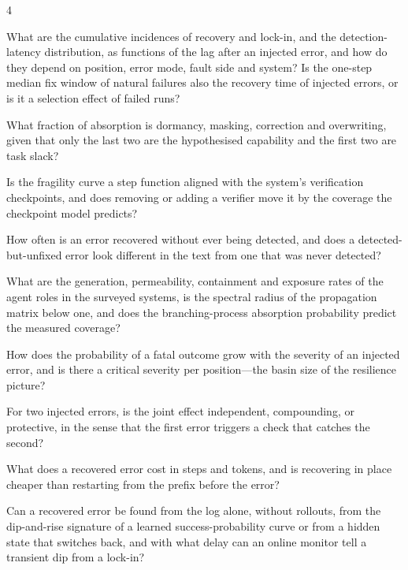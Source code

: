 \documentclass[10pt,a4paper]{article}
\begin{document}
\begin{rqbox}{4}
\begin{description}[leftmargin=3.2em,style=sameline,font=\bfseries,itemsep=1.5pt]
\item[RQ\,4.1] What are the cumulative incidences of recovery and lock-in, and the detection-latency distribution, as functions of the lag after an injected error, and how do they depend on position, error mode, fault side and system? Is the one-step median fix window of natural failures also the recovery time of injected errors, or is it a selection effect of failed runs?
\item[RQ\,4.2] What fraction of absorption is dormancy, masking, correction and overwriting, given that only the last two are the hypothesised capability and the first two are task slack?
\item[RQ\,4.3] Is the fragility curve a step function aligned with the system's verification checkpoints, and does removing or adding a verifier move it by the coverage the checkpoint model predicts?
\item[RQ\,4.4] How often is an error recovered without ever being detected, and does a detected-but-unfixed error look different in the text from one that was never detected?
\item[RQ\,4.5] What are the generation, permeability, containment and exposure rates of the agent roles in the surveyed systems, is the spectral radius of the propagation matrix below one, and does the branching-process absorption probability predict the measured coverage?
\item[RQ\,4.6] How does the probability of a fatal outcome grow with the severity of an injected error, and is there a critical severity per position---the basin size of the resilience picture?
\item[RQ\,4.7] For two injected errors, is the joint effect independent, compounding, or protective, in the sense that the first error triggers a check that catches the second?
\item[RQ\,4.8] What does a recovered error cost in steps and tokens, and is recovering in place cheaper than restarting from the prefix before the error?
\item[RQ\,4.9] Can a recovered error be found from the log alone, without rollouts, from the dip-and-rise signature of a learned success-probability curve or from a hidden state that switches back, and with what delay can an online monitor tell a transient dip from a lock-in?
\end{description}
\end{rqbox}
\end{document}
